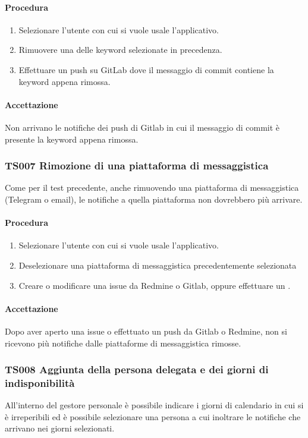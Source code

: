 		\paragraph*{Procedura}
			\begin{enumerate}
				\item Selezionare l'utente con cui si vuole usale l'applicativo.
				\item Rimuovere una delle keyword selezionate in precedenza.
				\item Effettuare un push su GitLab dove il messaggio di commit contiene la keyword appena rimossa.
			\end{enumerate}
		
		\paragraph*{Accettazione}
		Non arrivano le notifiche dei push di Gitlab in cui il messaggio di commit è presente la keyword appena rimossa.
		
	\subsubsection{TS007 Rimozione di una piattaforma di messaggistica}
		Come per il test precedente, anche rimuovendo una piattaforma di messaggistica (Telegram o email), le notifiche a quella piattaforma non dovrebbero più arrivare.
		
		\paragraph*{Procedura}
		\begin{enumerate}
			\item Selezionare l'utente con cui si vuole usale l'applicativo.
			\item Deselezionare una piattaforma di messaggistica precedentemente selezionata
			\item Creare o modificare una issue da Redmine o Gitlab, oppure effettuare un . 
		\end{enumerate}
	
		\paragraph*{Accettazione}
		Dopo aver aperto una issue o effettuato un push da Gitlab o Redmine, non si ricevono più notifiche dalle piattaforme di messaggistica rimosse.
		
	\subsubsection{TS008 Aggiunta della persona delegata e dei giorni di indisponibilità}
		All'interno del gestore personale è possibile indicare i giorni di calendario in cui si è irreperibili ed è possibile selezionare una persona a cui inoltrare le notifiche che arrivano nei giorni selezionati.
		
